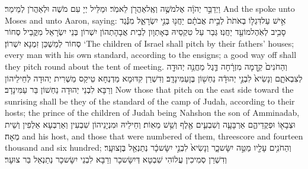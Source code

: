 \newperek
{}
{וַיְדַבֵּ֣ר יְהֹוָ֔ה אֶל\maqqaf מֹשֶׁ֥ה וְאֶֽל\maqqaf אַהֲרֹ֖ן לֵאמֹֽר׃}
{וּמַלֵּיל יְיָ עִם מֹשֶׁה וּלְאַהֲרֹן לְמֵימַר׃}
{And the \lord\space spoke unto Moses and unto Aaron, saying:}{}
{אִ֣ישׁ עַל\maqqaf דִּגְל֤וֹ בְאֹתֹת֙ לְבֵ֣ית אֲבֹתָ֔ם יַחֲנ֖וּ בְּנֵ֣י יִשְׂרָאֵ֑ל מִנֶּ֕גֶד סָבִ֥יב לְאֹֽהֶל\maqqaf מוֹעֵ֖ד יַחֲנֽוּ׃}
{גְּבַר עַל טִקְסֵיהּ בְּאָתְוָון לְבֵית אֲבָהָתְהוֹן יִשְׁרוֹן בְּנֵי יִשְׂרָאֵל מִקֳּבֵיל סְחוֹר סְחוֹר לְמַשְׁכַּן זִמְנָא יִשְׁרוֹן׃}
{‘The children of Israel shall pitch by their fathers’ houses; every man with his own standard, according to the ensigns; a good way off shall they pitch round about the tent of meeting.}{}
{וְהַחֹנִים֙ קֵ֣דְמָה מִזְרָ֔חָה דֶּ֛גֶל מַחֲנֵ֥ה יְהוּדָ֖ה לְצִבְאֹתָ֑ם וְנָשִׂיא֙ לִבְנֵ֣י יְהוּדָ֔ה נַחְשׁ֖וֹן בֶּן\maqqaf עַמִּינָדָֽב׃}
{וְדִשְׁרַן קִדּוּמָא מַדְנְחָא טֵיקַס מַשְׁרִית יְהוּדָה לְחֵילֵיהוֹן וְרַבָּא לִבְנֵי יְהוּדָה נַחְשׁוֹן בַּר עַמִּינָדָב׃}
{Now those that pitch on the east side toward the sunrising shall be they of the standard of the camp of Judah, according to their hosts; the prince of the children of Judah being Nahshon the son of Amminadab,}{}
{וּצְבָא֖וֹ וּפְקֻדֵיהֶ֑ם אַרְבָּעָ֧ה וְשִׁבְעִ֛ים אֶ֖לֶף וְשֵׁ֥שׁ מֵאֽוֹת׃}
{וְחֵילֵיהּ וּמִנְיָנֵיהוֹן שִׁבְעִין וְאַרְבְּעָא אַלְפִין וְשֵׁית מְאָה׃}
{and his host, and those that were numbered of them, threescore and fourteen thousand and six hundred;}{}
{וְהַחֹנִ֥ים עָלָ֖יו מַטֵּ֣ה יִשָּׂשכָ֑ר וְנָשִׂיא֙ לִבְנֵ֣י יִשָּׂשכָ֔ר נְתַנְאֵ֖ל בֶּן\maqqaf צוּעָֽר׃}
{וְדִשְׁרַן סְמִיכִין עֲלוֹהִי שִׁבְטָא דְּיִשָּׂשכָר וְרַבָּא לִבְנֵי יִשָּׂשכָר נְתַנְאֵל בַּר צוּעָר׃}
